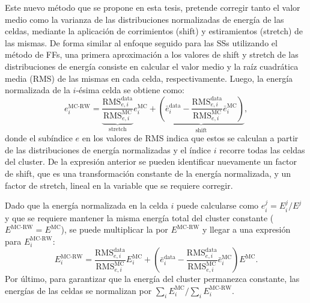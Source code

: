 Este nuevo método que se propone en esta tesis, pretende corregir tanto el valor medio como la varianza de las distribuciones normalizadas de energía de las celdas, mediante la aplicación de corrimientos (shift) y estiramientos (stretch) de las mismas. De forma similar al enfoque seguido para las \acp{SS} utilizando el método de \acp{FF}, una primera aproximación a los valores de shift y stretch de las distribuciones de energía consiste en calcular el valor medio y la raíz cuadrática media (RMS) de las mismas en cada celda, respectivamente.
Luego, la energía normalizada de la \(i\)-ésima celda se obtiene como:
\begin{equation}
    \label{eq:ss_corrections:cell_rw:calculation:new:normalized_e}
    e_i^{\text{MC-RW}} =
    \underbrace{\frac{\text{RMS}_{e,i}^{\text{data}}}{\text{RMS}_{e,i}^{\text{MC}}}}_{\text{stretch}} e_i^{\text{MC}}
    +
    \underbrace{\left(\bar e_i^{\text{data}} - \frac{\text{RMS}_{e,i}^{\text{data}}}{\text{RMS}_{e,i}^{\text{MC}}} \bar e_i^{\text{MC}}  \right)}_{\text{shift}},
\end{equation}
donde el subíndice \(e\) en los valores de RMS indica que estos se calculan a partir de las distribuciones de energía normalizadas y el índice \(i\) recorre todas las celdas del cluster. De la expresión anterior se pueden identificar nuevamente un factor de shift, que es una transformación constante de la energía normalizada, y un factor de stretch, lineal en la variable que se requiere corregir.

Dado que la energía normalizada en la celda \(i\) puede calcularse como \(e_i^{j} = E_i^{j} / E^{j}\) y que se requiere mantener la misma energía total del cluster constante (\(E^{\text{MC-RW}} = E^{\text{MC}}\)), se puede multiplicar la \Eqn{\ref{eq:ss_corrections:cell_rw:calculation:new:normalized_e}} por \(E^{\text{MC-RW}}\) y llegar a una expresión para \(E_i^{\text{MC-RW}}\):
\begin{equation}
    \label{eq:ss_corrections:cell_rw:calculation:new:correction_method}
    E_i^{\text{MC-RW}} =
    \frac{\text{RMS}_{e,i}^{\text{data}}}{\text{RMS}_{e,i}^{\text{MC}}} E_i^{\text{MC}}
    +
    \left( \bar e_i^{\text{data}} - \frac{\text{RMS}_{e,i}^{\text{data}}}{\text{RMS}_{e,i}^{\text{MC}}} \bar e_i^{\text{MC}} \right) E^{\text{MC}}.
\end{equation}
Por último, para garantizar que la energía del cluster permanezca constante, las energías de las celdas se normalizan por \(\sum_i E_i^{\text{MC}} / \sum_i E_i^{\text{MC-RW}}\).

